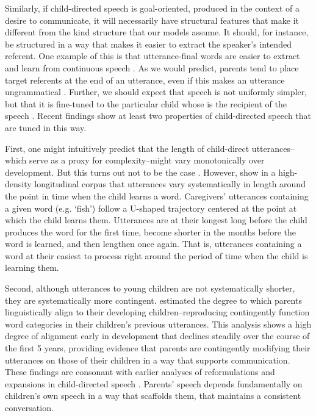 \documentclass[review]{elsarticle}
\begin{document}
Similarly, if child-directed speech is goal-oriented, produced in the context of a desire to communicate, it will necessarily have structural features that make it different from the kind structure that our models assume. It should, for instance, be structured in a way that makes it easier to extract the speaker's intended referent. One example of this is that utterance-final words are easier to extract and learn from continuous speech \citep{endress2005,yurovsky2012}. As we would predict, parents tend to place target referents at the end of an utterance, even if this makes an utterance ungrammatical \citep{aslin1996}. Further, we should expect that speech is not uniformly simpler, but that it is fine-tuned to the particular child whose is the recipient of the speech \citep{snow1972}. Recent findings show at least two properties of child-directed speech that are tuned in this way. 

First, one might intuitively predict that the length of child-direct utterances--which serve as a proxy for complexity--might vary monotonically over development. But this turns out not to be the case \citep{newport1977}. However, \cite{roy2009} show in a high-density longitudinal corpus that utterances vary systematically in length around the point in time when the child learns a word. Caregivers' utterances containing a given word (e.g. `fish') follow a U-shaped trajectory centered at the point at which the child learns them. Utterances are at their longest long before the child produces the word for the first time, become shorter in the months before the word is learned, and then lengthen once again. That is, utterances containing a word at their easiest to process right around the period of time when the child is learning them. 

Second, although utterances to young children are not systematically shorter, they are systematically more contingent. \cite{yurovsky2016a} estimated the degree to which parents linguistically align to their developing children--reproducing contingently function word categories in their children's previous utterances. This analysis shows a high degree of alignment early in development that declines steadily over the course of the first 5 years, providing evidence that parents are contingently modifying their utterances on those of their children in a way that supports communication. These findings are consonant with earlier analyses of reformulations and expansions in child-directed speech \citep{chouinard2003,saxton2000}. Parents' speech depends fundamentally on children's own speech in a way that scaffolds them, that maintains a consistent conversation.
\end{document}
